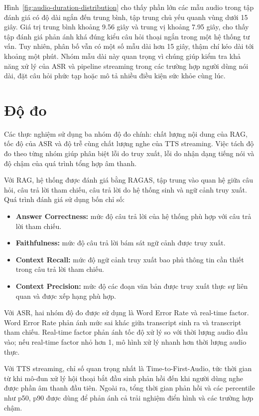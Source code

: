\documentclass[a4paper,13pt,twoside]{report}
\begin{document}
Hình~\ref{fig:audio-duration-distribution} cho thấy phần lớn các mẫu audio trong tập đánh giá có độ dài ngắn đến trung bình, tập trung chủ yếu quanh vùng dưới 15 giây. Giá trị trung bình khoảng 9.56 giây và trung vị khoảng 7.95 giây, cho thấy tập đánh giá phản ánh khá đúng kiểu câu hỏi thoại ngắn trong một hệ thống tư vấn. Tuy nhiên, phân bố vẫn có một số mẫu dài hơn 15 giây, thậm chí kéo dài tới khoảng một phút. Nhóm mẫu dài này quan trọng vì chúng giúp kiểm tra khả năng xử lý của ASR và pipeline streaming trong các trường hợp người dùng nói dài, đặt câu hỏi phức tạp hoặc mô tả nhiều điều kiện sức khỏe cùng lúc.

\section{Độ đo}

Các thực nghiệm sử dụng ba nhóm độ đo chính: chất lượng nội dung của RAG, tốc độ của ASR và độ trễ cùng chất lượng nghe của TTS streaming. Việc tách độ đo theo từng nhóm giúp phân biệt lỗi do truy xuất, lỗi do nhận dạng tiếng nói và độ chậm của quá trình tổng hợp âm thanh.

Với RAG, hệ thống được đánh giá bằng RAGAS, tập trung vào quan hệ giữa câu hỏi, câu trả lời tham chiếu, câu trả lời do hệ thống sinh và ngữ cảnh truy xuất. Quá trình đánh giá sử dụng bốn chỉ số:

\begin{itemize}
    \item \textbf{Answer Correctness:} mức độ câu trả lời của hệ thống phù hợp với câu trả lời tham chiếu.
    \item \textbf{Faithfulness:} mức độ câu trả lời bám sát ngữ cảnh được truy xuất.
    \item \textbf{Context Recall:} mức độ ngữ cảnh truy xuất bao phủ thông tin cần thiết trong câu trả lời tham chiếu.
    \item \textbf{Context Precision:} mức độ các đoạn văn bản được truy xuất thực sự liên quan và được xếp hạng phù hợp.
\end{itemize}

Với ASR, hai nhóm độ đo được sử dụng là Word Error Rate và real-time factor. Word Error Rate phản ánh mức sai khác giữa transcript sinh ra và transcript tham chiếu. Real-time factor phản ánh tốc độ xử lý so với thời lượng audio đầu vào; nếu real-time factor nhỏ hơn 1, mô hình xử lý nhanh hơn thời lượng audio thực.

Với TTS streaming, chỉ số quan trọng nhất là Time-to-First-Audio, tức thời gian từ khi mô-đun xử lý hội thoại bắt đầu sinh phản hồi đến khi người dùng nghe được phần âm thanh đầu tiên. Ngoài ra, tổng thời gian phản hồi và các percentile như p50, p90 được dùng để phản ánh cả trải nghiệm điển hình và các trường hợp chậm.
\end{document}
